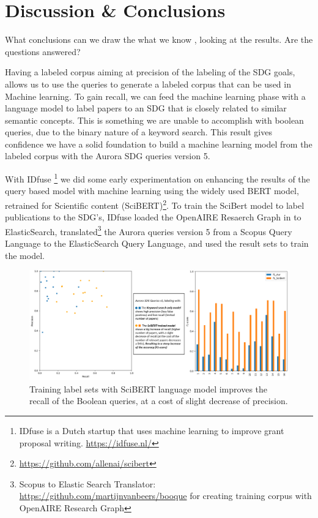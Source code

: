 \documentclass{article}
\begin{document}
\section{Discussion \& Conclusions}
What conclusions can we draw the what we know , looking at the results. Are the questions answered?

Having a labeled corpus aiming at precision of the labeling of the SDG goals, allows us to use the queries to generate a labeled corpus that can be used in Machine learning. \cite{zhang_matching_2020}  To gain recall, we can feed the machine learning phase with a language model to label papers to an SDG that is closely related to similar semantic concepts. This is something we are unable to accomplish with boolean queries, due to the binary nature of a keyword search. This result gives confidence we have a solid foundation to build a machine learning model from the labeled corpus with the Aurora SDG queries version 5. 

With IDfuse \footnote{IDfuse is a Dutch startup that uses machine learning to improve grant proposal writing. \url{https://idfuse.nl/} } we did some early experimentation on enhancing the results of the query based model with machine learning using the widely used BERT model, retrained for Scientific content (SciBERT)\footnote{\url{https://github.com/allenai/scibert}}. 
To train the SciBert model to label publications to the SDG's, IDfuse loaded the OpenAIRE Resaerch Graph in to ElasticSearch, translated\footnote{Scopus to Elastic Search Translator: \url{https://github.com/martijnvanbeers/booque} for creating training corpus with OpenAIRE Research Graph} the Aurora queries version 5 from a Scopus Query Language to the ElasticSearch Query Language, and used the result sets to train the model.

\begin{figure}[H]
	\centering
  \includegraphics[width=\textwidth]{figures/BERTmodel-improves-recall.png}
	\caption{Training label sets with SciBERT language model improves the recall of the Boolean queries, at a cost of slight decrease of precision.}
	\label{BERTmodel}
\end{figure}
\end{document}
